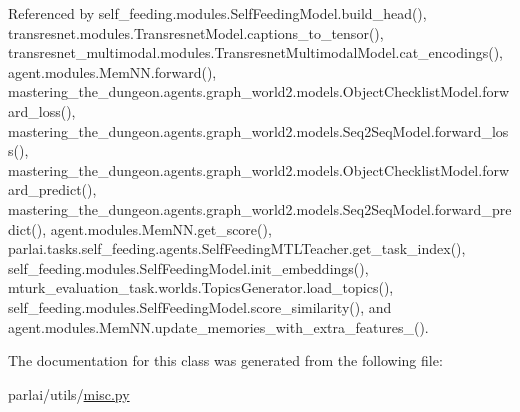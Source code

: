 Referenced by self\+\_\+feeding.\+modules.\+Self\+Feeding\+Model.\+build\+\_\+head(), transresnet.\+modules.\+Transresnet\+Model.\+captions\+\_\+to\+\_\+tensor(), transresnet\+\_\+multimodal.\+modules.\+Transresnet\+Multimodal\+Model.\+cat\+\_\+encodings(), agent.\+modules.\+Mem\+N\+N.\+forward(), mastering\+\_\+the\+\_\+dungeon.\+agents.\+graph\+\_\+world2.\+models.\+Object\+Checklist\+Model.\+forward\+\_\+loss(), mastering\+\_\+the\+\_\+dungeon.\+agents.\+graph\+\_\+world2.\+models.\+Seq2\+Seq\+Model.\+forward\+\_\+loss(), mastering\+\_\+the\+\_\+dungeon.\+agents.\+graph\+\_\+world2.\+models.\+Object\+Checklist\+Model.\+forward\+\_\+predict(), mastering\+\_\+the\+\_\+dungeon.\+agents.\+graph\+\_\+world2.\+models.\+Seq2\+Seq\+Model.\+forward\+\_\+predict(), agent.\+modules.\+Mem\+N\+N.\+get\+\_\+score(), parlai.\+tasks.\+self\+\_\+feeding.\+agents.\+Self\+Feeding\+M\+T\+L\+Teacher.\+get\+\_\+task\+\_\+index(), self\+\_\+feeding.\+modules.\+Self\+Feeding\+Model.\+init\+\_\+embeddings(), mturk\+\_\+evaluation\+\_\+task.\+worlds.\+Topics\+Generator.\+load\+\_\+topics(), self\+\_\+feeding.\+modules.\+Self\+Feeding\+Model.\+score\+\_\+similarity(), and agent.\+modules.\+Mem\+N\+N.\+update\+\_\+memories\+\_\+with\+\_\+extra\+\_\+features\+\_\+().



The documentation for this class was generated from the following file\+:\begin{DoxyCompactItemize}
\item 
parlai/utils/\hyperlink{misc_8py}{misc.\+py}\end{DoxyCompactItemize}
